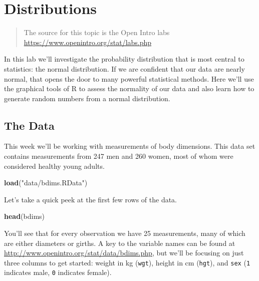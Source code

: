 \documentclass[]{book}
\newenvironment{Shaded}{\begin{snugshade}}{\end{snugshade}}
\newcommand{\KeywordTok}[1]{\textcolor[rgb]{0.13,0.29,0.53}{\textbf{{#1}}}}
\newcommand{\StringTok}[1]{\textcolor[rgb]{0.31,0.60,0.02}{{#1}}}
\newcommand{\NormalTok}[1]{{#1}}
\theoremstyle{definition}
\theoremstyle{definition}
\theoremstyle{remark}
\begin{document}
\hypertarget{distributions}{\chapter*{Distributions}\label{distributions}}

\begin{quote}
The source for this topic is the Open Intro labs
\url{https://www.openintro.org/stat/labs.php}
\end{quote}

In this lab we'll investigate the probability distribution that is most
central to statistics: the normal distribution. If we are confident that
our data are nearly normal, that opens the door to many powerful
statistical methods. Here we'll use the graphical tools of R to assess
the normality of our data and also learn how to generate random numbers
from a normal distribution.

\section*{The Data}\label{the-data}

This week we'll be working with measurements of body dimensions. This
data set contains measurements from 247 men and 260 women, most of whom
were considered healthy young adults.

\begin{Shaded}
\begin{Highlighting}[]
\KeywordTok{load}\NormalTok{(}\StringTok{"data/bdims.RData"}\NormalTok{)}
\end{Highlighting}
\end{Shaded}

Let's take a quick peek at the first few rows of the data.

\begin{Shaded}
\begin{Highlighting}[]
\KeywordTok{head}\NormalTok{(bdims)}
\end{Highlighting}
\end{Shaded}

You'll see that for every observation we have 25 measurements, many of
which are either diameters or girths. A key to the variable names can be
found at \url{http://www.openintro.org/stat/data/bdims.php}, but we'll
be focusing on just three columns to get started: weight in kg
(\texttt{wgt}), height in cm (\texttt{hgt}), and \texttt{sex}
(\texttt{1} indicates male, \texttt{0} indicates female).
\end{document}
